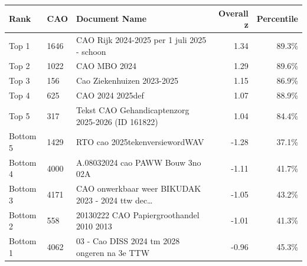 \begin{tabular}{llp{6.5cm}rr}
    \hline\hline
    Rank & CAO & Document Name & Overall z & Percentile \\
    \hline
    Top 1 & 1646 & CAO Rijk 2024-2025 per 1 juli 2025 - schoon & 1.34 & 89.3\% \\
    Top 2 & 1022 & CAO MBO 2024 & 1.29 & 89.6\% \\
    Top 3 & 156 & Cao Ziekenhuizen 2023-2025 & 1.15 & 86.9\% \\
    Top 4 & 625 & CAO 2024 2025def & 1.07 & 88.9\% \\
    Top 5 & 317 & Tekst CAO Gehandicaptenzorg 2025-2026 (ID 161822) & 1.04 & 84.4\% \\
    Bottom 5 & 1429 & RTO cao 2025tekenversiewordWAV & -1.28 & 37.1\% \\
    Bottom 4 & 4000 & A.08032024 cao PAWW Bouw 3no 02A & -1.11 & 41.7\% \\
    Bottom 3 & 4171 & CAO onwerkbaar weer BIKUDAK 2023 - 2024 ttw dec… & -1.05 & 43.2\% \\
    Bottom 2 & 558 & 20130222 CAO Papiergroothandel 2010 2013 & -1.01 & 41.3\% \\
    Bottom 1 & 4062 & 03 - Cao DISS 2024 tm 2028 ongeren na 3e TTW & -0.96 & 45.3\% \\
    \hline\hline
\end{tabular}
